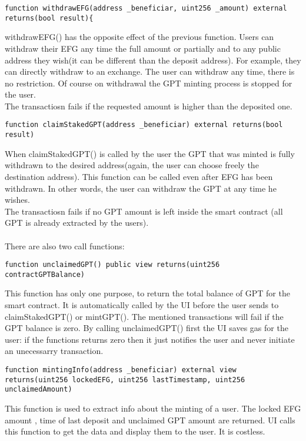 \documentclass{article}
\begin{document}
\begin{lstlisting}[language=Solidity,firstnumber=110,escapechar=@]
function withdrawEFG(address _beneficiar, uint256 _amount) external returns(bool result){
\end{lstlisting}
withdrawEFG() has the opposite effect of the previous function. Users can withdraw their EFG any time the full amount or partially and to any public address they wish(it can be different than the deposit address). For example, they can directly withdraw to an exchange. The user can withdraw any time, there is no restriction. Of course on withdrawal the GPT minting process is stopped for the user.\\
The transactiosn fails if the requested amount is higher than the deposited one.

\begin{lstlisting}[language=Solidity,firstnumber=75,escapechar=@]
function claimStakedGPT(address _beneficiar) external returns(bool result)
\end{lstlisting}
When claimStakedGPT() is called by the user the GPT that was minted is fully withdrawn to the desired address(again, the user can choose freely the destination address). This function can be called even after EFG has been withdrawn. In other words, the user can withdraw the GPT at any time he wishes.\\
The transactiosn fails if no GPT amount is left inside the smart contract (all GPT is already extracted by the users).
\\
\\
There are also two call functions:

\begin{lstlisting}[language=Solidity,firstnumber=143,escapechar=@]
function unclaimedGPT() public view returns(uint256 contractGPTBalance)
\end{lstlisting}
This function has only one purpose, to return the total balance of GPT for the smart contract. It is automatically called by the UI before the user sends to claimStakedGPT() or mintGPT(). The mentioned transactions will fail if the GPT balance is zero. By calling unclaimedGPT() first the UI saves gas for the user: if the functions returns zero then it just notifies the user and never initiate an unecessarry transaction.

\begin{lstlisting}[language=Solidity,firstnumber=134,escapechar=@]
function mintingInfo(address _beneficiar) external view returns(uint256 lockedEFG, uint256 lastTimestamp, uint256 unclaimedAmount)
\end{lstlisting}
This function is used to extract info about the minting of a user. The locked EFG amount , time of last deposit and unclaimed GPT amount are returned. UI calls this function to get the data and display them to the user. It is costless.
\end{document}
